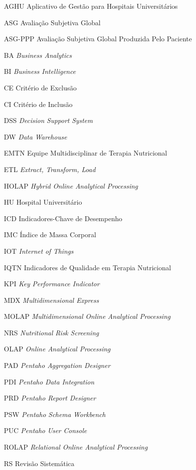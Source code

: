
\begin{siglas}
\item[AGHU]{Aplicativo de Gestão para Hospitais Universitários}
\item[ASG]{Avaliação Subjetiva Global}
\item[ASG-PPP]{Avaliação Subjetiva Global Produzida Pelo Paciente}
\item[BA]{\textit{Business Analytics}}
\item[BI]{\textit{Business Intelligence}}
\item[CE]{Critério de Exclusão}
\item[CI]{Critério de Inclusão}
\item[DSS]{\textit{Decision Support System}}
\item[DW]{\textit{Data Warehouse}}
\item[EMTN]{Equipe Multidisciplinar de Terapia Nutricional}
\item[ETL]{\textit{Extract, Transform, Load}}
\item[HOLAP]{\textit{Hybrid Online Analytical Processing}}
\item[HU]{Hospital Universitário}
\item[ICD]{Indicadores-Chave de Desempenho}
\item[IMC]{Índice de Massa Corporal}
\item[IOT]{\textit{Internet of Things}}
\item[IQTN]{Indicadores de Qualidade em Terapia Nutricional}
\item[KPI]{\textit{Key Performance Indicator}}
\item[MDX]{\textit{Multidimensional Express}}
\item[MOLAP]{\textit{Multidimensional Online Analytical Processing}}
\item[NRS]{\textit{Nutritional Risk Screening}}
\item[OLAP]{\textit{Online Analytical Processing}}
\item[PAD]{\textit{Pentaho Aggregation Designer}}
\item[PDI]{\textit{Pentaho Data Integration}}
\item[PRD]{\textit{Pentaho Report Designer}}
\item[PSW]{\textit{Pentaho Schema Workbench}}
\item[PUC]{\textit{Pentaho User Console}}
\item[ROLAP]{\textit{Relational Online Analytical Processing}}
\item[RS]{Revisão Sistemática}

\end{siglas}
